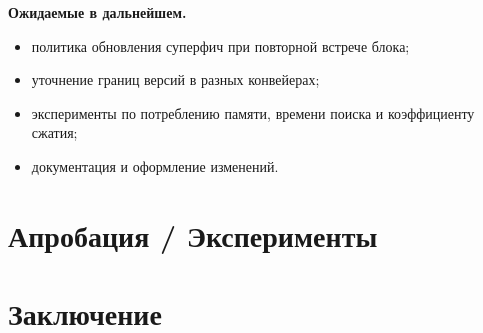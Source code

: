 \documentclass[a4paper]{article}
\begin{document}
\textbf{Ожидаемые в дальнейшем.}
\begin{itemize}
    \item политика обновления суперфич при повторной встрече блока;
    \item уточнение границ версий в разных конвейерах;
    \item эксперименты по потреблению памяти, времени поиска и коэффициенту
    сжатия;
    \item документация и оформление изменений.
\end{itemize}


\section{Апробация / Эксперименты}





\section{Заключение}




\end{document}

